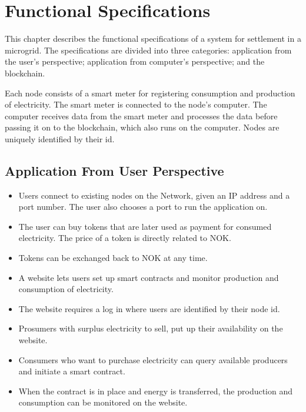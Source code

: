 \chapter{Functional Specifications} 
This chapter describes the functional specifications of a system for settlement in a microgrid. The specifications are divided into three categories: application from the user's perspective; application from computer's perspective; and the blockchain.

Each node consists of a smart meter for registering consumption and production of electricity. The smart meter is connected to the node's computer. The computer receives data from the smart meter and processes the data before passing it on to the blockchain, which also runs on the computer. Nodes are uniquely identified by their id.  

\section{Application From User Perspective}
\begin{itemize}
\item Users connect to existing nodes on the Network, given an IP address and a port number. The user also chooses a port to run the application on. 
\item The user can buy tokens that are later used as payment for consumed electricity. The price of a token is directly related to NOK.
\item Tokens can be exchanged back to NOK at any time.
\item A website lets users set up smart contracts and monitor production and consumption of electricity. %
\item The website requires a log in where users are identified by their node id. 
\item Prosumers with surplus electricity to sell, put up their availability on the website.
\item Consumers who want to purchase electricity can query available producers and initiate a smart contract.
\item When the contract is in place and energy is transferred, the production and consumption can be monitored on the website.
\end{itemize}


